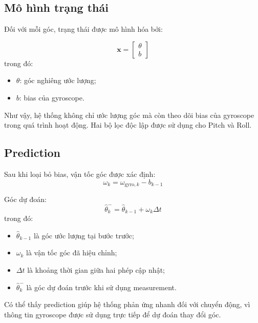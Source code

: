 \subsection{Mô hình trạng thái}

Đối với mỗi góc, trạng thái được mô hình hóa bởi:

\begin{equation}
\mathbf{x}
=
\begin{bmatrix}
\theta \\
b
\end{bmatrix}
\end{equation}
trong đó:
\begin{itemize}
    \item $\theta$: góc nghiêng ước lượng;
    \item $b$: bias của gyroscope.
\end{itemize}

Như vậy, hệ thống không chỉ ước lượng góc mà còn theo dõi bias của gyroscope trong quá trình hoạt động. Hai bộ lọc độc lập được sử dụng cho Pitch và Roll.


\subsection{Prediction}

Sau khi loại bỏ bias, vận tốc góc được xác định:
\begin{equation}
\omega_k
=
\omega_{\text{gyro},k}
-
b_{k-1}
\end{equation}

Góc dự đoán:
\begin{equation}
\hat{\theta}_k^{-}
=
\hat{\theta}_{k-1}
+
\omega_k\Delta t
\end{equation}
trong đó:
\begin{itemize}
    \item $\hat{\theta}_{k-1}$ là góc ước lượng tại bước trước;
    \item $\omega_k$ là vận tốc góc đã hiệu chỉnh;
    \item $\Delta t$ là khoảng thời gian giữa hai phép cập nhật;
    \item $\hat{\theta}_k^{-}$ là góc dự đoán trước khi sử dụng measurement.
\end{itemize}

Có thể thấy prediction giúp hệ thống phản ứng nhanh đối với chuyển động, vì thông tin gyroscope được sử dụng trực tiếp để dự đoán thay đổi góc.

